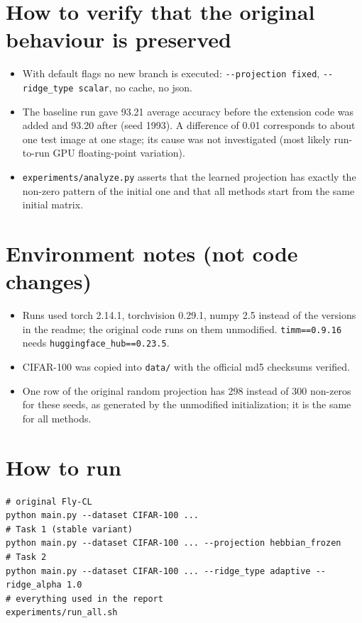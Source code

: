 \documentclass[11pt,a4paper]{article}
\begin{document}
\section{How to verify that the original behaviour is preserved}

\begin{itemize}
  \item With default flags no new branch is executed: \texttt{-{}-projection fixed},
        \texttt{-{}-ridge\_type scalar}, no cache, no json.
  \item The baseline run gave 93.21 average accuracy before the extension code was added and 93.20
        after (seed 1993). A difference of 0.01 corresponds to about one test image at one stage;
        its cause was not investigated (most likely run-to-run GPU floating-point variation).
  \item \texttt{experiments/analyze.py} asserts that the learned projection has exactly the non-zero
        pattern of the initial one and that all methods start from the same initial matrix.
\end{itemize}

\section{Environment notes (not code changes)}

\begin{itemize}
  \item Runs used torch 2.14.1, torchvision 0.29.1, numpy 2.5 instead of the versions in the readme;
        the original code runs on them unmodified. \texttt{timm==0.9.16} needs
        \texttt{huggingface\_hub==0.23.5}.
  \item CIFAR-100 was copied into \texttt{data/} with the official md5 checksums verified.
  \item One row of the original random projection has 298 instead of 300 non-zeros for these seeds,
        as generated by the unmodified initialization; it is the same for all methods.
\end{itemize}

\section{How to run}

\begin{verbatim}
# original Fly-CL
python main.py --dataset CIFAR-100 ...
# Task 1 (stable variant)
python main.py --dataset CIFAR-100 ... --projection hebbian_frozen
# Task 2
python main.py --dataset CIFAR-100 ... --ridge_type adaptive --ridge_alpha 1.0
# everything used in the report
experiments/run_all.sh
\end{verbatim}
\end{document}
